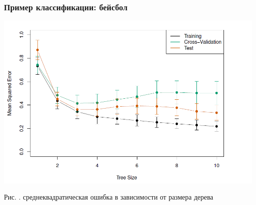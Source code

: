 \documentclass[pdf, 9pt, usenames, dvipsnames, unicode, hyperref={bookmarks=true,bookmarksopen=false, bookmarksnumbered}]{beamer}
\begin{document}

\begin{frame}\frametitle{Пример классификации: бейсбол}

\begin{center}
	\includegraphics[scale=0.4]{pic64}
\end{center}

    \begin{center}
	Рис. . среднеквадратическая ошибка в зависимости от размера дерева
    \end{center}


\end{frame}

\end{document}
